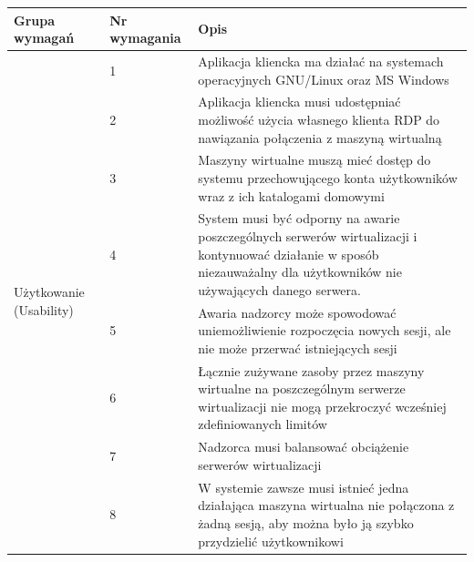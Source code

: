 \documentclass[12pt]{article}
\begin{document}
\begin{center}
	\begin{table}[h!]
		\begin{tabular}{|p{}|p{}|p{}|}
			\hline Grupa wymagań                            & Nr wymagania & Opis                                                                                                                                                                    \\ \hline
			\multirow[t]{8}{=}{Użytkowanie (Usability)}     & 1            & Aplikacja kliencka ma działać na systemach operacyjnych GNU/Linux oraz MS Windows                                                                                       \\ \cline{2-3}
			                                                & 2            & Aplikacja kliencka musi udostępniać możliwość użycia własnego klienta RDP do nawiązania połączenia z maszyną wirtualną                                                  \\ \cline{2-3}
			                                                & 3            & Maszyny wirtualne muszą mieć dostęp do systemu przechowującego konta użytkowników wraz z ich katalogami domowymi                                                        \\ \hline
			\multirow[t]{7}{=}{Niezawodność (Reliability)}  & 4            & System musi być odporny na awarie poszczególnych serwerów wirtualizacji i kontynuować działanie w sposób niezauważalny dla użytkowników nie używających danego serwera. \\ \cline{2-3}
			                                                & 5            & Awaria nadzorcy może spowodować uniemożliwienie rozpoczęcia nowych sesji, ale nie może przerwać istniejących sesji                                                      \\ \hline
			\multirow[t]{10}{=}{Wydajność (Performance)}    & 6            & Łącznie zużywane zasoby przez maszyny wirtualne na poszczególnym serwerze wirtualizacji nie mogą przekroczyć wcześniej zdefiniowanych limitów                           \\ \cline{2-3}
			                                                & 7            & Nadzorca musi balansować obciążenie serwerów wirtualizacji                                                                                                              \\ \cline{2-3}
			                                                & 8            & W systemie zawsze musi istnieć jedna działająca maszyna wirtualna nie połączona z żadną sesją, aby można było ją szybko przydzielić użytkownikowi                       \\ \cline{2-3}

\end{tabular}
\end{table}
\end{center}
\end{document}
